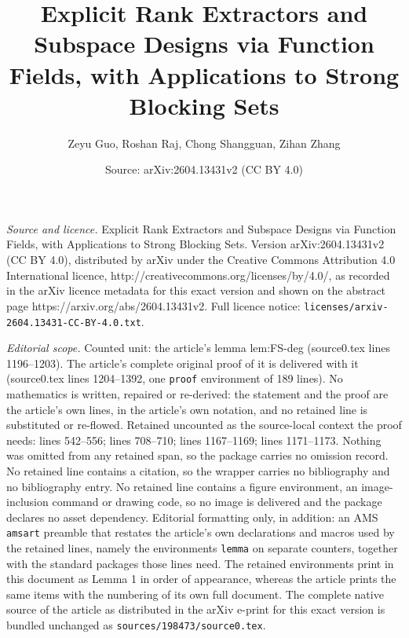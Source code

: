 \documentclass[10pt,a4paper]{amsart}
\title{Explicit Rank Extractors and Subspace Designs via Function Fields, with Applications to Strong Blocking Sets}
\author{Zeyu Guo, Roshan Raj, Chong Shangguan, Zihan Zhang}
\date{Source: arXiv:2604.13431v2 (CC BY 4.0)}
\begin{document}
\maketitle

\noindent\emph{Source and licence.} Explicit Rank Extractors and Subspace Designs via Function Fields, with Applications to Strong Blocking Sets. Version arXiv:2604.13431v2 (CC BY 4.0), distributed by arXiv under the Creative Commons Attribution 4.0 International licence, http://creativecommons.org/licenses/by/4.0/, as recorded in the arXiv licence metadata for this exact version and shown on the abstract page https://arxiv.org/abs/2604.13431v2. Full licence notice: \texttt{licenses/arxiv-2604.13431-CC-BY-4.0.txt}.\par\smallskip

\noindent\textit{Editorial scope.} Counted unit: the article's lemma lem:FS-deg (source0.tex lines 1196--1203). The article's complete original proof of it is delivered with it (source0.tex lines 1204--1392, one \texttt{proof} environment of 189 lines). No mathematics is written, repaired or re-derived: the statement and the proof are the article's own lines, in the article's own notation, and no retained line is substituted or re-flowed.  Retained uncounted as the source-local context the proof needs: lines 542--556; lines 708--710; lines 1167--1169; lines 1171--1173.  Nothing was omitted from any retained span, so the package carries no omission record.  No retained line contains a citation, so the wrapper carries no bibliography and no bibliography entry.  No retained line contains a figure environment, an image-inclusion command or drawing code, so no image is delivered and the package declares no asset dependency.  Editorial formatting only, in addition: an AMS \texttt{amsart} preamble that restates the article's own declarations and macros used by the retained lines, namely the environments \texttt{lemma} on separate counters, together with the standard packages those lines need.  The retained environments print in this document as Lemma 1 in order of appearance, whereas the article prints the same items with the numbering of its own full document.  The complete native source of the article as distributed in the arXiv e-print for this exact version is bundled unchanged as \texttt{sources/198473/source0.tex}.
\end{document}
